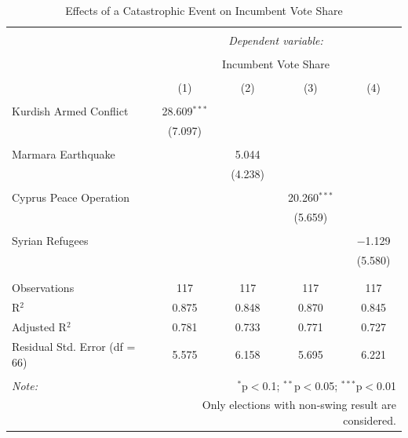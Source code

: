 \documentclass[12pt]{article}
\begin{document}
\begin{table}[!htbp] \centering 
  \caption{Effects of a Catastrophic Event on Incumbent Vote Share} 
  \label{} 
\begin{tabular}{@{\extracolsep{5pt}}lcccc} 
\\[-1.8ex]\hline 
\hline \\[-1.8ex] 
 & \multicolumn{4}{c}{\textit{Dependent variable:}} \\ 
\cline{2-5} 
\\[-1.8ex] & \multicolumn{4}{c}{Incumbent Vote Share} \\ 
\\[-1.8ex] & (1) & (2) & (3) & (4)\\ 
\hline \\[-1.8ex] 
 Kurdish Armed Conflict & 28.609$^{***}$ &  &  &  \\ 
  & (7.097) &  &  &  \\ 
  & & & & \\ 
 Marmara Earthquake &  & 5.044 &  &  \\ 
  &  & (4.238) &  &  \\ 
  & & & & \\ 
 Cyprus Peace Operation &  &  & 20.260$^{***}$ &  \\ 
  &  &  & (5.659) &  \\ 
  & & & & \\ 
 Syrian Refugees &  &  &  & $-$1.129 \\ 
  &  &  &  & (5.580) \\ 
  & & & & \\ 
\hline \\[-1.8ex] 
Observations & 117 & 117 & 117 & 117 \\ 
R$^{2}$ & 0.875 & 0.848 & 0.870 & 0.845 \\ 
Adjusted R$^{2}$ & 0.781 & 0.733 & 0.771 & 0.727 \\ 
Residual Std. Error (df = 66) & 5.575 & 6.158 & 5.695 & 6.221 \\ 
\hline 
\hline \\[-1.8ex] 
\textit{Note:}  & \multicolumn{4}{r}{$^{*}$p$<$0.1; $^{**}$p$<$0.05; $^{***}$p$<$0.01} \\ 
 & \multicolumn{4}{r}{Only elections with non-swing result are considered.} \\ 
\end{tabular} 
\end{table} 
\end{document}
